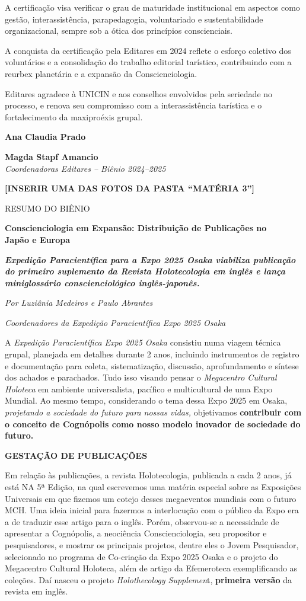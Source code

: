 A certificação visa verificar o grau de maturidade institucional em aspectos como gestão, interassistência, parapedagogia, voluntariado e sustentabilidade organizacional, sempre sob a ótica dos princípios conscienciais.

A conquista da certificação pela Editares em 2024 reflete o esforço coletivo dos voluntários e a consolidação do trabalho editorial tarístico, contribuindo com a reurbex planetária e a expansão da Conscienciologia.

Editares agradece à UNICIN e aos conselhos envolvidos pela seriedade no processo, e renova seu compromisso com a interassistência tarística e o fortalecimento da maxiproéxis grupal.

\textbf{Ana Claudia Prado}

\textbf{Magda Stapf Amancio\\
}\emph{Coordenadoras Editares -- Biênio 2024--2025}

\textbf{{[}INSERIR UMA DAS FOTOS DA PASTA ``MATÉRIA 3''{]}}

RESUMO DO BIÊNIO

\textbf{Conscienciologia em Expansão: Distribuição de Publicações no\\
Japão e Europa}

\emph{\textbf{Expedição Paracientífica para a Expo 2025 Osaka viabiliza publicação do primeiro suplemento da Revista Holotecologia em inglês e lança miniglossário conscienciológico inglês-japonês.}}

\emph{Por Luziânia Medeiros e Paulo Abrantes}

\emph{Coordenadores da Expedição Paracientífica Expo 2025 Osaka}

A \emph{Expedição Paracientífica Expo 2025 Osaka} consistiu numa viagem técnica grupal, planejada em detalhes durante 2 anos, incluindo instrumentos de registro e documentação para coleta, sistematização, discussão, aprofundamento e síntese dos achados e parachados. Tudo isso visando pensar o \emph{Megacentro Cultural Holoteca} em ambiente universalista, pacífico e multicultural de uma Expo Mundial. Ao mesmo tempo, considerando o tema dessa Expo 2025 em Osaka, \emph{projetando a sociedade do futuro para nossas vidas,} objetivamos \textbf{contribuir com o conceito de Cognópolis como nosso modelo inovador de sociedade do futuro.}

\textbf{GESTAÇÃO DE PUBLICAÇÕES}

Em relação às publicações, a revista Holotecologia, publicada a cada 2 anos, já está NA 5ª Edição, na qual escrevemos uma matéria especial sobre as Exposições Universais em que fizemos um cotejo desses megaeventos mundiais com o futuro MCH. Uma ideia inicial para fazermos a interlocução com o público da Expo era a de traduzir esse artigo para o inglês. Porém, observou-se a necessidade de apresentar a Cognópolis, a neociência Conscienciologia, seu propositor e pesquisadores, e mostrar os principais projetos, dentre eles o Jovem Pesquisador, selecionado no programa de Co-criação da Expo 2025 Osaka e o projeto do Megacentro Cultural Holoteca, além de artigo da Efemeroteca exemplificando as coleções. Daí nasceu o projeto \emph{Holothecology Supplemen}t, \textbf{primeira versão} da revista em inglês.

